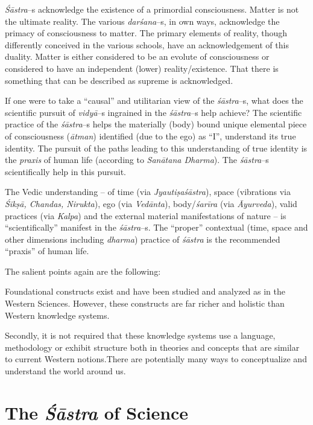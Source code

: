 \textit{Śāstra}–s acknowledge the existence of a primordial consciousness. Matter is not the ultimate reality. The various \textit{darśana}–s, in own ways, acknowledge the primacy of consciousness to matter. The primary elements of reality, though differently conceived in the various schools, have an acknowledgement of this duality. Matter is either considered to be an evolute of consciousness or considered to have an independent (lower) reality/existence. That there is something that can be described as supreme is acknowledged.

If one were to take a “causal” and utilitarian view of the \textit{śāstra}–s, what does the scientific pursuit of \textit{vidyā}–s ingrained in the \textit{śāstra}–s help achieve? The scientific practice of the \textit{śāstra}–s helps the materially (body) bound unique elemental piece of consciousness (\textit{ātman}) identified (due to the ego) as “I”, understand its true identity. The pursuit of the paths leading to this understanding of true identity is the \textit{praxis} of human life (according to \textit{Sanātana Dharma}). The \textit{śāstra}–s scientifically help in this pursuit. 

The Vedic understanding – of time (via \textit{Jyautiṣaśāstra}), space (vibrations via \textit{Śikṣā, Chandas, Nirukta}), ego (via \textit{Vedānta}), body/\textit{śarīra} (via \textit{Āyurveda}), valid practices (via \textit{Kalpa}) and the external material manifestations of nature – is “scientifically” manifest in the \textit{śāstra}–s. The “proper” contextual (time, space and other dimensions including \textit{dharma}) practice of \textit{śāstra} is the recommended “praxis” of human life.

The salient points again are the following:

\item Foundational constructs exist and have been studied and analyzed as in the Western Sciences. However, these constructs are far richer and holistic than Western knowledge systems.

 \item Secondly, it is not required that these knowledge systems use a language, methodology or exhibit structure both in theories and concepts that are similar to current Western notions.There are potentially many ways to conceptualize and understand the world around us.



\section*{The \textit{Śāstra} of Science}

